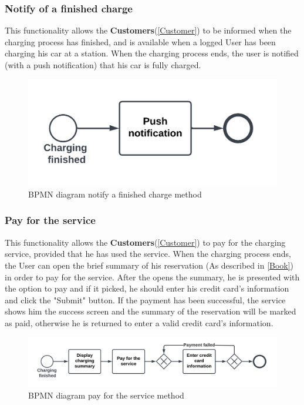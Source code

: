 \subsubsection{Notify of a finished charge}
This functionality allows the \textbf{Customers}(\ref{Customer}) to be informed when the charging process has finished, and is available when a logged User has been charging his car at a station.
When the charging process ends, the user is notified (with a push notification) that his car is fully charged.
\begin{figure}[H]
    \begin{center}
        \includegraphics[scale=0.2]{img/fun-not-fin.png}
        \caption{BPMN diagram notify a finished charge method}
    \end{center}
\end{figure}
\subsubsection{Pay for the service}
This functionality allows the \textbf{Customers}(\ref{Customer}) to pay for the charging service, provided that he has used the service.
When the charging process ends, the User can open the brief summary of his reservation (As described in \ref{Book}) in order to pay for the service.
After the opens the summary, he is presented with the option to pay and if it picked, he should enter his credit card's information and click the "Submit" button.
If the payment has been successful, the service shows him the success screen and the summary of the reservation will be marked as paid, otherwise he is returned to enter a valid credit card's information.
\begin{figure}[H]
    \begin{center}
        \includegraphics[width=\textwidth]{img/fun-pay.png}
        \caption{BPMN diagram pay for the service method}
    \end{center}
\end{figure}
